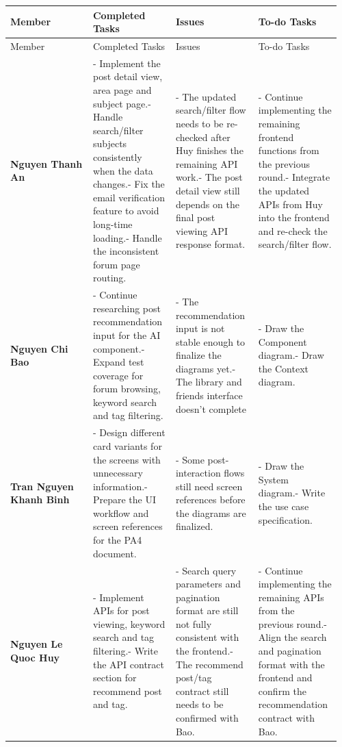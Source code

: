 \documentclass[12pt]{article}
\begin{document}
\begin{longtable}{|p{0.24\linewidth}|p{0.24\linewidth}|p{0.24\linewidth}|p{0.24\linewidth}|}
\hline
Member & Completed Tasks & Issues & To-do Tasks \\
\endfirsthead
\hline
Member & Completed Tasks & Issues & To-do Tasks \\
\endhead
\hline
\endfoot
\hline
\endlastfoot
\textbf{Nguyen Thanh An} & - Implement the post detail view, area page and subject page.\newline- Handle search/filter subjects consistently when the data changes.\newline- Fix the email verification feature to avoid long-time loading.\newline- Handle the inconsistent forum page routing. & - The updated search/filter flow needs to be re-checked after Huy finishes the remaining API work.\newline- The post detail view still depends on the final post viewing API response format. & - Continue implementing the remaining frontend functions from the previous round.\newline- Integrate the updated APIs from Huy into the frontend and re-check the search/filter flow. \\
\hline
\textbf{Nguyen Chi Bao} & - Continue researching post recommendation input for the AI component.\newline- Expand test coverage for forum browsing, keyword search and tag filtering. & - The recommendation input is not stable enough to finalize the diagrams yet.\newline- The library and friends interface doesn't complete & - Draw the Component diagram.\newline- Draw the Context diagram. \\
\hline
\textbf{Tran Nguyen Khanh Binh} & - Design different card variants for the screens with unnecessary information.\newline- Prepare the UI workflow and screen references for the PA4 document. & - Some post-interaction flows still need screen references before the diagrams are finalized. & - Draw the System diagram.\newline- Write the use case specification. \\
\hline
\textbf{Nguyen Le Quoc Huy} & - Implement APIs for post viewing, keyword search and tag filtering.\newline- Write the API contract section for recommend post and tag. & - Search query parameters and pagination format are still not fully consistent with the frontend.\newline- The recommend post/tag contract still needs to be confirmed with Bao. & - Continue implementing the remaining APIs from the previous round.\newline- Align the search and pagination format with the frontend and confirm the recommendation contract with Bao. \\

\end{longtable}
\end{document}
